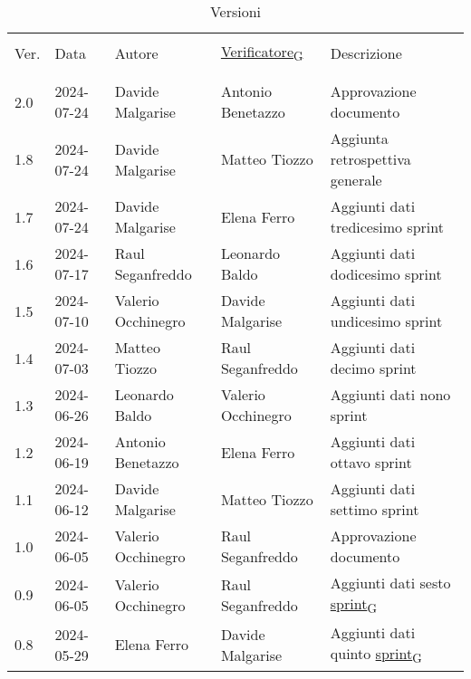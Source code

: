 \documentclass[12pt]{article} %
\begin{document}


\newpage



\begin{table}[!h]
	\footnotesize
	\begin{center}
		\caption*{Versioni}
		\vspace{0.5cm}
		\begin{tabular}{ l l l l p{6cm} }
			\hline                                                                                          \\[-2ex]
			Ver. & Data & Autore & \href{https://7last.github.io/docs/pb/documentazione-interna/glossario\#verificatore}{Verificatore\textsubscript{G}} & Descrizione \\
			\\[-2ex] \hline \\[-1.5ex]
			2.0 & 2024-07-24 & Davide Malgarise   & Antonio Benetazzo  & Approvazione documento\\
			1.8 & 2024-07-24 & Davide Malgarise   & Matteo Tiozzo      & Aggiunta retrospettiva generale\\
			1.7 & 2024-07-24 & Davide Malgarise   & Elena Ferro        & Aggiunti dati tredicesimo sprint\\
			1.6 & 2024-07-17 & Raul Seganfreddo   & Leonardo Baldo     & Aggiunti dati dodicesimo sprint\\
			1.5 & 2024-07-10 & Valerio Occhinegro & Davide Malgarise   & Aggiunti dati undicesimo sprint\\
			1.4 & 2024-07-03 & Matteo Tiozzo      & Raul Seganfreddo   & Aggiunti dati decimo sprint\\
			1.3 & 2024-06-26 & Leonardo Baldo     & Valerio Occhinegro & Aggiunti dati nono sprint\\
			1.2 & 2024-06-19 & Antonio Benetazzo  & Elena Ferro        & Aggiunti dati ottavo sprint\\
			1.1 & 2024-06-12 & Davide Malgarise   & Matteo Tiozzo      & Aggiunti dati settimo sprint\\
			1.0 & 2024-06-05 & Valerio Occhinegro & Raul Seganfreddo   & Approvazione documento\\
			0.9 & 2024-06-05 & Valerio Occhinegro & Raul Seganfreddo   & Aggiunti dati sesto \href{https://7last.github.io/docs/pb/documentazione-interna/glossario\#sprint}{sprint\textsubscript{G}}\\
			0.8 & 2024-05-29 & Elena Ferro        & Davide Malgarise   & Aggiunti dati quinto \href{https://7last.github.io/docs/pb/documentazione-interna/glossario\#sprint}{sprint\textsubscript{G}}\\

\end{tabular}
\end{center}
\end{table}
\end{document}
